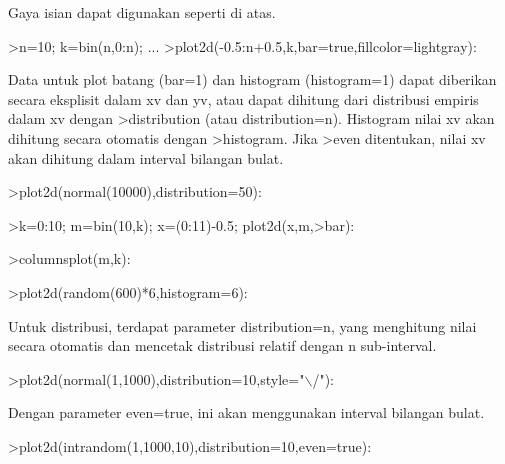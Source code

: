 \begin{eulernotebook}
\begin{eulercomment}
Gaya isian dapat digunakan seperti di atas.
\end{eulercomment}
\begin{eulerprompt}
>n=10; k=bin(n,0:n); ...
>plot2d(-0.5:n+0.5,k,bar=true,fillcolor=lightgray):
\end{eulerprompt}
\begin{eulercomment}
Data untuk plot batang (bar=1) dan histogram (histogram=1) dapat
diberikan secara eksplisit dalam xv dan yv, atau dapat dihitung dari
distribusi empiris dalam xv dengan \textgreater{}distribution (atau
distribution=n). Histogram nilai xv akan dihitung secara otomatis
dengan \textgreater{}histogram. Jika \textgreater{}even ditentukan, nilai xv akan dihitung dalam
interval bilangan bulat.
\end{eulercomment}
\begin{eulerprompt}
>plot2d(normal(10000),distribution=50):
\end{eulerprompt}
\begin{eulerprompt}
>k=0:10; m=bin(10,k); x=(0:11)-0.5; plot2d(x,m,>bar):
\end{eulerprompt}
\begin{eulerprompt}
>columnsplot(m,k):
\end{eulerprompt}
\begin{eulerprompt}
>plot2d(random(600)*6,histogram=6):
\end{eulerprompt}
\begin{eulercomment}
Untuk distribusi, terdapat parameter distribution=n, yang menghitung
nilai secara otomatis dan mencetak distribusi relatif dengan n
sub-interval.
\end{eulercomment}
\begin{eulerprompt}
>plot2d(normal(1,1000),distribution=10,style="\(\backslash\)/"):
\end{eulerprompt}
\begin{eulercomment}
Dengan parameter even=true, ini akan menggunakan interval bilangan
bulat.
\end{eulercomment}
\begin{eulerprompt}
>plot2d(intrandom(1,1000,10),distribution=10,even=true):

\end{eulerprompt}
\end{eulernotebook}
